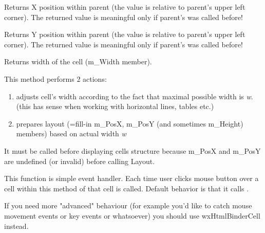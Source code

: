 Returns X position within parent (the value is relative to parent's
upper left corner). The returned value is meaningful only if
parent's  was called before!

\label{wxhtmlcellgetposy}


Returns Y position within parent (the value is relative to parent's
upper left corner). The returned value is meaningful only if
parent's  was called before!

\label{wxhtmlcellgetwidth}


Returns width of the cell (m_Width member).

\label{wxhtmlcelllayout}


This method performs 2 actions:

\begin{enumerate}
\item adjusts cell's width according to the fact that maximal possible width is {\it w}.
(this has sense when working with horizontal lines, tables etc.)
\item prepares layout (=fill-in m\_PosX, m\_PosY (and sometimes m\_Height) members)
based on actual width {\it w}
\end{enumerate}

It must be called before displaying cells structure because
m\_PosX and m\_PosY are undefined (or invalid)
before calling Layout.

\label{wxhtmlcellonmouseclick}


This function is simple event handler. Each time user clicks mouse button over a cell
within  this method of that cell is called. Default behavior is
that it calls .


If you need more "advanced" behaviour (for example you'd like to catch mouse movement events or
key events or whatsoever) you should use wxHtmlBinderCell instead.

